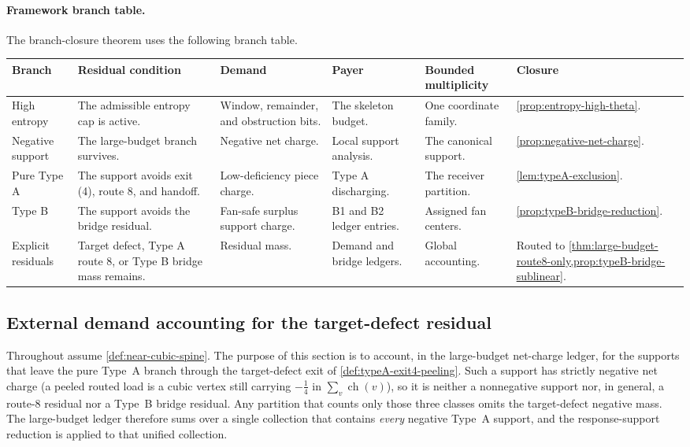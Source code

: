 \documentclass[11pt]{article}
\newcommand{\ch}{\operatorname{ch}}
\newcommand{\FrameworkBranchTableHeader}{%
\toprule
\textbf{Branch} & \textbf{Residual condition} & \textbf{Demand} & \textbf{Payer} & \textbf{Bounded multiplicity} & \textbf{Closure}\\
\midrule
}
\begin{document}
\paragraph{Framework branch table.}
The branch-closure theorem uses the following branch table.
\begin{longtable}{L{0.13\textwidth} L{0.19\textwidth} L{0.14\textwidth} L{0.14\textwidth} L{0.17\textwidth} L{0.17\textwidth}}
\FrameworkBranchTableHeader
High entropy
&
The admissible entropy cap is active.
&
Window, remainder, and obstruction bits.
&
The skeleton budget.
&
One coordinate family.
&
\cref{prop:entropy-high-theta}.
\\
\addlinespace
Negative support
&
The large-budget branch survives.
&
Negative net charge.
&
Local support analysis.
&
The canonical support.
&
\cref{prop:negative-net-charge}.
\\
\addlinespace
Pure Type A
&
The support avoids exit \textup{(4)}, route 8, and handoff.
&
Low-deficiency piece charge.
&
Type A discharging.
&
The receiver partition.
&
\cref{lem:typeA-exclusion}.
\\
\addlinespace
Type B
&
The support avoids the bridge residual.
&
Fan-safe surplus support charge.
&
B1 and B2 ledger entries.
&
Assigned fan centers.
&
\cref{prop:typeB-bridge-reduction}.
\\
\addlinespace
Explicit residuals
&
Target defect, Type A route 8, or Type B bridge mass remains.
&
Residual mass.
&
Demand and bridge ledgers.
&
Global accounting.
&
Routed to \cref{thm:large-budget-route8-only,prop:typeB-bridge-sublinear}.
\\
\bottomrule
\end{longtable}

\subsection{External demand accounting for the target-defect residual}\label{sec:exit4-closure}

Throughout assume \cref{def:near-cubic-spine}.  The purpose of this section is to
account, in the large-budget net-charge ledger, for the supports that leave the
pure Type~A branch through the target-defect exit of
\cref{def:typeA-exit4-peeling}.  Such a support has strictly negative net charge
(a peeled routed load is a cubic vertex still carrying $-\tfrac14$ in
$\sum_v\ch(v)$), so it is neither a nonnegative support nor, in general, a
route-8 residual nor a Type~B bridge residual.  Any partition that counts only
those three classes omits the target-defect negative mass.  The large-budget
ledger therefore sums over a single collection that contains \emph{every}
negative Type~A support, and the response-support reduction is applied to that unified
collection.
\end{document}
